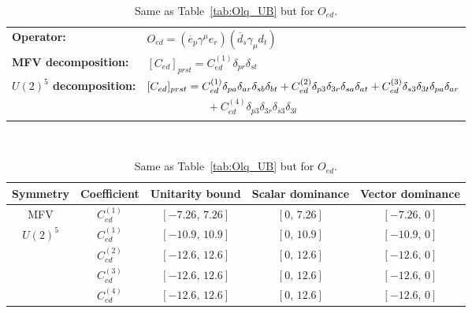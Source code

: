 \begin{table}[htbp]
\centering
{\small
\begin{tabular}{ll}
    \textbf{Operator:} &
        $\boxed{O_{ed} = (\overline e_p \gamma^\mu e_r)(\overline d_s \gamma_\mu d_t)}$ \\[0.2cm]
    \textbf{MFV decomposition:} &
        $[C_{ed}]_{prst} =
            C_{ed}^{(1)}\delta_{pr}\delta_{st}$ \\[0.15cm]
    \textbf{$U(2)^5$ decomposition:} &
        $[C_{ed}]_{prst} =
            C_{ed}^{(1)}\Pij{p}{r}{a}\Pij{s}{t}{b}
            + C_{ed}^{(2)}\delta_{p3}\delta_{3r}\Pij{s}{t}{a} + C_{ed}^{(3)}\delta_{s3}\delta_{3t}\Pij{p}{r}{a}
            $ \\
        & $\phantom{[C_{ed}]_{prst} ={}}+ C_{ed}^{(4)}\delta_{p3}\delta_{3r}\delta_{s3}\delta_{3t}$ \\
\end{tabular}
\\[0.3cm]
\renewcommand{\arraystretch}{1.3}
\begin{tabular}{ccccc}
    \toprule
    \rowcolor{hdrcolor}
    \textbf{Symmetry} & \textbf{Coefficient}
        & \textbf{Unitarity bound}
        & \textbf{Scalar dominance}
        & \textbf{Vector dominance} \\
    \midrule
    \multirow{1}{*}{MFV}
        & $C_{ed}^{(1)}$ & $[-7.26,\, 7.26]$  & $[0,\, 7.26]$      & $[-7.26,\, 0]$    \\
    \midrule
    \multirow{4}{*}{$U(2)^5$}
        & $C_{ed}^{(1)}$ & $[-10.9,\, 10.9]$  & $[0,\, 10.9]$      & $[-10.9,\, 0]$    \\
        & $C_{ed}^{(2)}$ & $[-12.6,\, 12.6]$  & $[0,\, 12.6]$  & $[-12.6,\, 0]$ \\
        & $C_{ed}^{(3)}$ & $[-12.6,\, 12.6]$  & $[0,\, 12.6]$  & $[-12.6,\, 0]$ \\
        & $C_{ed}^{(4)}$ & $[-12.6,\, 12.6]$  & $[0,\, 12.6]$  & $[-12.6,\, 0]$ \\
    \bottomrule
\end{tabular}}
\caption{Same as Table~\ref{tab:Olq_UB} but for $O_{ed}$.}
\label{tab:Oed_UB}
\end{table}

